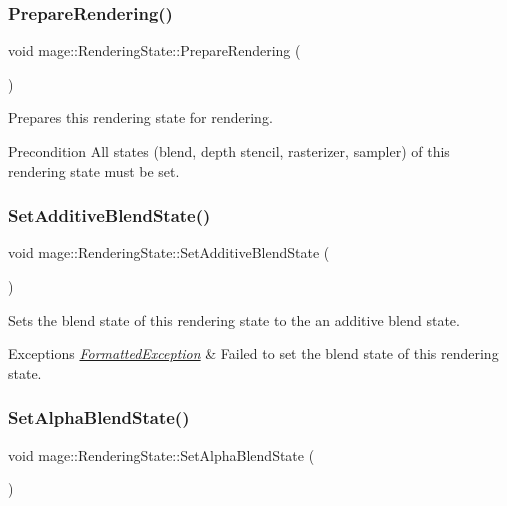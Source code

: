 \subsubsection{\texorpdfstring{Prepare\+Rendering()}{PrepareRendering()}}
{\footnotesize\ttfamily void mage\+::\+Rendering\+State\+::\+Prepare\+Rendering (\begin{DoxyParamCaption}{ }\end{DoxyParamCaption})}

Prepares this rendering state for rendering.

\begin{DoxyPrecond}{Precondition}
All states (blend, depth stencil, rasterizer, sampler) of this rendering state must be set. 
\end{DoxyPrecond}
\hypertarget{structmage_1_1_rendering_state_a61341d0fc7f1140faaf8fb33f9bb13fb}{}\label{structmage_1_1_rendering_state_a61341d0fc7f1140faaf8fb33f9bb13fb} 
\subsubsection{\texorpdfstring{Set\+Additive\+Blend\+State()}{SetAdditiveBlendState()}}
{\footnotesize\ttfamily void mage\+::\+Rendering\+State\+::\+Set\+Additive\+Blend\+State (\begin{DoxyParamCaption}{ }\end{DoxyParamCaption})}

Sets the blend state of this rendering state to the an additive blend state.


\begin{DoxyExceptions}{Exceptions}
{\em \hyperlink{structmage_1_1_formatted_exception}{Formatted\+Exception}} & Failed to set the blend state of this rendering state. \\
\hline
\end{DoxyExceptions}
\hypertarget{structmage_1_1_rendering_state_a7f97752f22b0a32912f24d16c1aa2441}{}\label{structmage_1_1_rendering_state_a7f97752f22b0a32912f24d16c1aa2441} 
\subsubsection{\texorpdfstring{Set\+Alpha\+Blend\+State()}{SetAlphaBlendState()}}
{\footnotesize\ttfamily void mage\+::\+Rendering\+State\+::\+Set\+Alpha\+Blend\+State (\begin{DoxyParamCaption}{ }\end{DoxyParamCaption})}

